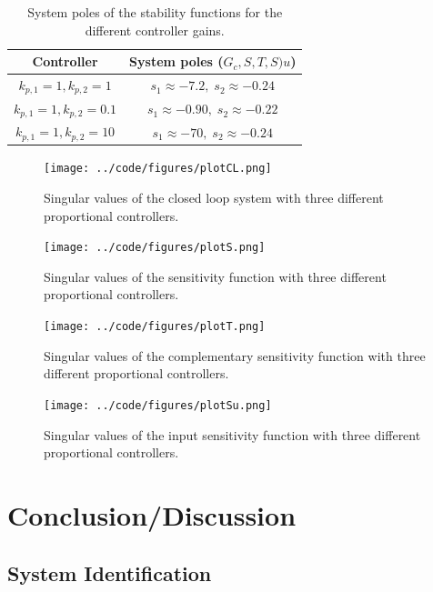 \documentclass[a4paper, titlepage]{article}
\begin{document}
\begin{table}[h!]
\begin{center}
\begin{tabular}{||c | c ||}
 \hline
 Controller & System poles ($G_c, S, T, S)u$) \\ [0.5ex] 
 \hline\hline
 $k_{p,1} = 1, k_{p,2} = 1$ &  $s_1 \approx -7.2, \; s_2 \approx -0.24$ \\ 
 \hline
 $k_{p,1} = 1, k_{p,2} = 0.1$ &  $s_1 \approx -0.90, \; s_2 \approx -0.22$ \\
 \hline
 $k_{p,1} = 1, k_{p,2} = 10$ &  $s_1 \approx -70, \; s_2 \approx -0.24$ \\
 \hline
\end{tabular}
\end{center}
\caption{System poles of the stability functions for the different controller gains.}
\label{tab:poles}
\end{table}


\begin{figure}[H]
\center
\texttt{[image: ../code/figures/plotCL.png]}
\caption{Singular values of the closed loop system with three different proportional controllers.}
\label{fig:plotCL}
\end{figure}

\begin{figure}[H]
\center
\texttt{[image: ../code/figures/plotS.png]}
\caption{Singular values of the sensitivity function with three different proportional controllers.}
\label{fig:plotS}
\end{figure}

\begin{figure}[H]
\center
\texttt{[image: ../code/figures/plotT.png]}
\caption{Singular values of the complementary sensitivity function with three different proportional controllers.}
\label{fig:plotT}
\end{figure}

\begin{figure}[H]
\center
\texttt{[image: ../code/figures/plotSu.png]}
\caption{Singular values of the input sensitivity function with three different proportional controllers.}
\label{fig:plotSu}
\end{figure}


\section{Conclusion/Discussion}

\subsection{System Identification}
\end{document}
